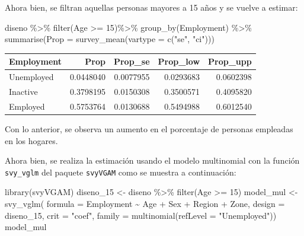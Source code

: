 \documentclass[
  12pt,
]{book}
\newenvironment{Shaded}{\begin{snugshade}}{\end{snugshade}}
\newcommand{\AttributeTok}[1]{\textcolor[rgb]{0.77,0.63,0.00}{#1}}
\newcommand{\DecValTok}[1]{\textcolor[rgb]{0.00,0.00,0.81}{#1}}
\newcommand{\FunctionTok}[1]{\textcolor[rgb]{0.00,0.00,0.00}{#1}}
\newcommand{\NormalTok}[1]{#1}
\newcommand{\OtherTok}[1]{\textcolor[rgb]{0.56,0.35,0.01}{#1}}
\newcommand{\SpecialCharTok}[1]{\textcolor[rgb]{0.00,0.00,0.00}{#1}}
\newcommand{\StringTok}[1]{\textcolor[rgb]{0.31,0.60,0.02}{#1}}
\begin{document}
Ahora bien, se filtran aquellas personas mayores a 15 años y se vuelve a estimar:

\begin{Shaded}
\begin{Highlighting}[]
\NormalTok{diseno }\SpecialCharTok{\%\textgreater{}\%} \FunctionTok{filter}\NormalTok{(Age }\SpecialCharTok{\textgreater{}=} \DecValTok{15}\NormalTok{)}\SpecialCharTok{\%\textgreater{}\%} \FunctionTok{group\_by}\NormalTok{(Employment) }\SpecialCharTok{\%\textgreater{}\%} 
  \FunctionTok{summarise}\NormalTok{(}\AttributeTok{Prop =} \FunctionTok{survey\_mean}\NormalTok{(}\AttributeTok{vartype =} \FunctionTok{c}\NormalTok{(}\StringTok{"se"}\NormalTok{, }\StringTok{"ci"}\NormalTok{)))}
\end{Highlighting}
\end{Shaded}

\begin{tabular}{l|r|r|r|r}
\hline
Employment & Prop & Prop\_se & Prop\_low & Prop\_upp\\
\hline
Unemployed & 0.0448040 & 0.0077955 & 0.0293683 & 0.0602398\\
\hline
Inactive & 0.3798195 & 0.0150308 & 0.3500571 & 0.4095820\\
\hline
Employed & 0.5753764 & 0.0130688 & 0.5494988 & 0.6012540\\
\hline
\end{tabular}

Con lo anterior, se observa un aumento en el porcentaje de personas empleadas en los hogares.

Ahora bien, se realiza la estimación usando el modelo multinomial con la función \texttt{svy\_vglm} del paquete \texttt{svyVGAM} como se muestra a continuación:

\begin{Shaded}
\begin{Highlighting}[]
\FunctionTok{library}\NormalTok{(svyVGAM)}
\NormalTok{diseno\_15 }\OtherTok{\textless{}{-}}\NormalTok{ diseno }\SpecialCharTok{\%\textgreater{}\%} \FunctionTok{filter}\NormalTok{(Age }\SpecialCharTok{\textgreater{}=} \DecValTok{15}\NormalTok{)}
\NormalTok{model\_mul }\OtherTok{\textless{}{-}} \FunctionTok{svy\_vglm}\NormalTok{(}
    \AttributeTok{formula =}\NormalTok{ Employment }\SpecialCharTok{\textasciitilde{}}\NormalTok{ Age }\SpecialCharTok{+}\NormalTok{ Sex }\SpecialCharTok{+}\NormalTok{ Region }\SpecialCharTok{+}\NormalTok{ Zone,}
                   \AttributeTok{design =}\NormalTok{ diseno\_15, }
     \AttributeTok{crit =} \StringTok{"coef"}\NormalTok{,}
    \AttributeTok{family =} \FunctionTok{multinomial}\NormalTok{(}\AttributeTok{refLevel =} \StringTok{"Unemployed"}\NormalTok{))}
\NormalTok{model\_mul}
\end{Highlighting}
\end{Shaded}
\end{document}
